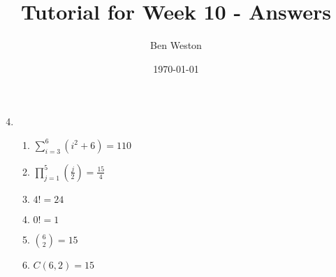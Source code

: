 \documentclass{article}
\title{Tutorial for Week 10 - Answers}
\author{Ben Weston}
\date{\today}
\begin{document}
\maketitle
\begin{enumerate}\setcounter{enumi}{3}
        \item 
                \begin{enumerate}
                        \item $\sum^6_{i=3}(i^2+6)=110$
                        \item $\prod^5_{j=1}(\frac{j}{2})=\frac{15}{4}$
                        \item $4!=24$
                        \item $0!=1$
                        \item ${6\choose2}=15$
                        \item $C(6,2)=15$
                \end{enumerate}
\end{enumerate}
\end{document}
